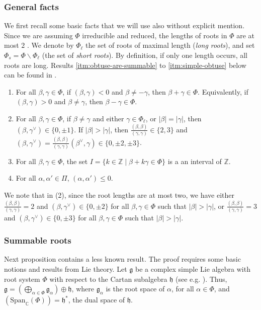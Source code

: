 \documentclass[ALCO,published]{cedram}
\theoremstyle{plain}
\newcommand\mf{\mathfrak}
\newcommand\smeno{\smallsetminus}
\newcommand\ganz{\mathbb Z}
\newcommand\compl{\mathbb C}
\newcommand\gen{\mathrm{Span}}
\newcommand\al{\alpha}
\newcommand\be{\beta}
\newcommand\ga{\gamma}
\renewcommand{\leq}{\leqslant}
\begin{document}
\subsubsection{General facts}\label{sssec:general-roots}
We first recall some  basic facts that we will use also without explicit mention. 
Since we are assuming $\Phi$ irreducible and reduced, the lengths of roots in $\Phi$ are at most $2$ \cite[Ch.~VI, \S~1.4]{Bou}. 
We denote by $\Phi_\ell$ the set of roots of maximal length ({\it long roots}), and set $\Phi_s=\Phi\smeno\Phi_\ell$ (the set of {\it short roots}). 
By definition, if only one length occurs, all roots are long.
Results \ref{itm:obtuse-are-summable} to \ref{itm:simple-obtuse}
below can be found in  \cite[Ch.~VI, \S~1, n.~3, 4, 5]{Bou}.

\begin{enumerate}
\item
For all $\be, \ga\in \Phi$, if $(\be, \ga)<0$ and $\be\neq -\ga$, then $\be+\ga\in \Phi$. Equivalently, if $(\be, \ga)>0$ and $\be\neq \ga$, then $\be-\ga\in \Phi$.
\label{itm:obtuse-are-summable}
\item
For all $\be, \ga\in \Phi$, if $\be\neq \ga$ and  either $\ga\in \Phi_\ell$, or $|\be|=|\ga|$, then $(\be, \ga^\vee)\in \{0, \pm 1\}$. 
If $|\be|>|\ga|$, then $\frac{(\be, \be)}{(\ga, \ga)}\in \{2, 3\}$ and $(\be, \ga^\vee)=
\frac{(\be,\be)}{(\ga,\ga)}(\be^\vee, \ga)
\in \{0, \pm 2, \pm 3\}$. 
\label{itm:length-ratio}
\item
For all $\be, \ga\in \Phi$, the set $I=\{k\in \ganz\mid \be+k\ga\in \Phi\}$ is a an interval of $\ganz$. 
\label{itm:root-string}
\item
For all $\al, \al'\in \Pi$, $(\al, \al')\leq 0$.
\label{itm:simple-obtuse}
\end{enumerate}

We note that in (2), since the root lengths are at most two, we have either  $\frac{(\be,\be)}{(\ga,\ga)}=2$ and $(\be, \ga^\vee)\in \{0,\pm2\}$ for all $\be, \ga\in \Phi$ such that  $|\be|>|\ga|$, or $\frac{(\be,\be)}{(\ga,\ga)}=3$ and $(\be, \ga^\vee)\in \{0,\pm 3\}$ for all $\be, \ga\in \Phi$  such that $|\be|>|\ga|$.

\subsubsection{Summable roots}\label{sssec:summable-roots}
Next proposition contains a less known result.
The proof requires some basic notions and results from Lie theory.
Let $\mf g$ be  a complex simple Lie algebra with root system $\Phi$ with respect to the Cartan subalgebra $\mf h$ (see e.g. \cite[\S 18]{HuLie}). 
Thus, $\mf g=\left(\bigoplus_{\al\in\Phi}\mf g_\al\right)\oplus \mf h$, where $\mf g_\al$ is the root space of $\al$,  for all $\al\in \Phi$, and  $\left(\gen_\compl(\Phi)\right)=\mf h^*$, the dual space of $\mf h$. 
\end{document}
